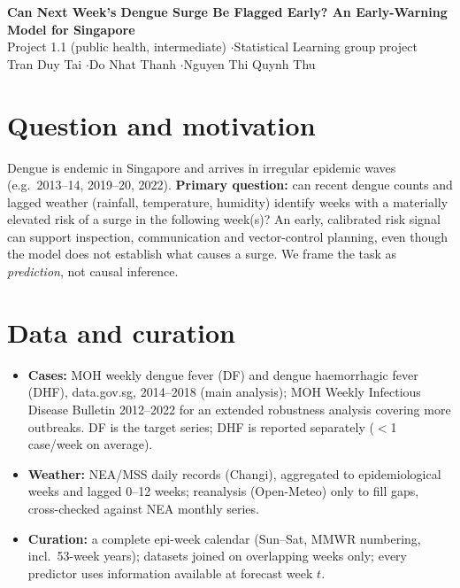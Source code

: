 \documentclass[10pt,a4paper]{article}
\begin{document}
\begin{center}
{\large\bfseries Can Next Week's Dengue Surge Be Flagged Early? An Early-Warning Model for Singapore}\\[2pt]
{\small Project 1.1 (public health, intermediate) \quad$\cdot$\quad Statistical Learning group project
\\ Tran Duy Tai \quad$\cdot$\quad Do Nhat Thanh \quad$\cdot$\quad Nguyen Thi Quynh Thu}
\end{center}

\section{Question and motivation}
Dengue is endemic in Singapore and arrives in irregular epidemic waves (e.g.\ 2013--14, 2019--20, 2022).
\textbf{Primary question:} can recent dengue counts and lagged weather (rainfall, temperature, humidity)
identify weeks with a materially elevated risk of a surge in the following week(s)? An early, calibrated
risk signal can support inspection, communication and vector-control planning, even though the model
does not establish what causes a surge. We frame the task as \emph{prediction}, not causal inference.

\section{Data and curation}
\begin{itemize}
  \item \textbf{Cases:} MOH weekly dengue fever (DF) and dengue haemorrhagic fever (DHF), data.gov.sg, 2014--2018
        (main analysis); MOH Weekly Infectious Disease Bulletin 2012--2022 for an extended robustness analysis
        covering more outbreaks. DF is the target series; DHF is reported separately ($<$1 case/week on average).
  \item \textbf{Weather:} NEA/MSS daily records (Changi), aggregated to epidemiological weeks and lagged 0--12 weeks;
        reanalysis (Open-Meteo) only to fill gaps, cross-checked against NEA monthly series.
  \item \textbf{Curation:} a complete epi-week calendar (Sun--Sat, MMWR numbering, incl.\ 53-week years);
        datasets joined on overlapping weeks only; every predictor uses information available at forecast week $t$.
\end{itemize}
\end{document}
